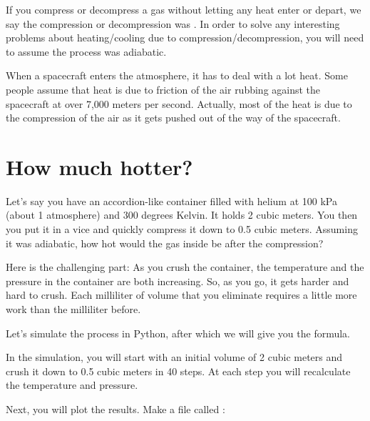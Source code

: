 If you compress or decompress a gas without letting any heat enter or depart, we say the compression or decompression was . In order to solve any interesting problems about heating/cooling due to compression/decompression, you will need to assume the process was adiabatic.

When a spacecraft enters the atmosphere, it has to deal with a lot heat. Some people assume that heat is due to friction of the air rubbing against the 
spacecraft at over 7,000 meters per second. Actually, most of the heat is due to the compression of the air as it gets pushed out of the way of the spacecraft.

\section{How much hotter?}

Let's say you have an accordion-like container filled with helium at 100 kPa (about 1 atmosphere) and 300 degrees Kelvin. It holds 2 cubic meters. You then you put it in a vice and quickly compress it down to 0.5 cubic meters. Assuming it was adiabatic, how hot would the gas inside be after the compression?

Here is the challenging part: As you crush the container, the temperature and the pressure in the container are both increasing. So, as you go, it gets harder and hard to crush. Each milliliter of volume that you eliminate requires a little more work than the milliliter before.

Let's simulate the process in Python, after which we will give you the formula. 

In the simulation, you will start with an initial volume of 2 cubic meters and crush it down to 0.5 cubic meters in 40 steps. At each step you will recalculate the temperature and pressure.

Next, you will plot the results. Make a file called :

